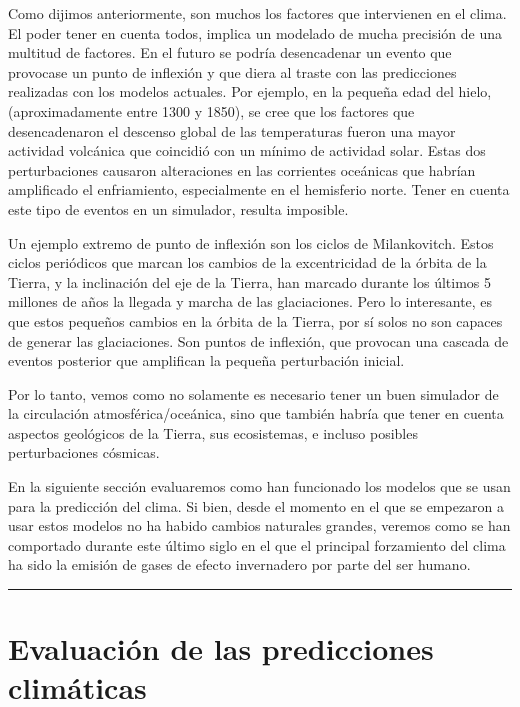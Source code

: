 \documentclass[
  10pt,
  a4paper,
  DIV=11,
  numbers=noendperiod,
  open=any]{scrreprt}
\numberwithin{equation}{chapter}
\numberwithin{equation}{section}
\renewcommand{\[}{\begin{equation}}
\renewcommand{\]}{\end{equation}}
\begin{document}
Como dijimos anteriormente, son muchos los factores que intervienen en
el clima. El poder tener en cuenta todos, implica un modelado de mucha
precisión de una multitud de factores. En el futuro se podría
desencadenar un evento que provocase un punto de inflexión y que diera
al traste con las predicciones realizadas con los modelos actuales. Por
ejemplo, en la pequeña edad del hielo, (aproximadamente entre 1300 y
1850), se cree que los factores que desencadenaron el descenso global de
las temperaturas fueron una mayor actividad volcánica que coincidió con
un mínimo de actividad solar. Estas dos perturbaciones causaron
alteraciones en las corrientes oceánicas que habrían amplificado el
enfriamiento, especialmente en el hemisferio norte. Tener en cuenta este
tipo de eventos en un simulador, resulta imposible.

Un ejemplo extremo de punto de inflexión son los ciclos de Milankovitch.
Estos ciclos periódicos que marcan los cambios de la excentricidad de la
órbita de la Tierra, y la inclinación del eje de la Tierra, han marcado
durante los últimos 5 millones de años la llegada y marcha de las
glaciaciones. Pero lo interesante, es que estos pequeños cambios en la
órbita de la Tierra, por sí solos no son capaces de generar las
glaciaciones. Son puntos de inflexión, que provocan una cascada de
eventos posterior que amplifican la pequeña perturbación inicial.

Por lo tanto, vemos como no solamente es necesario tener un buen
simulador de la circulación atmosférica/oceánica, sino que también
habría que tener en cuenta aspectos geológicos de la Tierra, sus
ecosistemas, e incluso posibles perturbaciones cósmicas.

En la siguiente sección evaluaremos como han funcionado los modelos que
se usan para la predicción del clima. Si bien, desde el momento en el
que se empezaron a usar estos modelos no ha habido cambios naturales
grandes, veremos como se han comportado durante este último siglo en el
que el principal forzamiento del clima ha sido la emisión de gases de
efecto invernadero por parte del ser humano.

\begin{center}\rule{0.5\linewidth}{0.5pt}\end{center}

\chapter{Evaluación de las predicciones
climáticas}\label{evaluaciuxf3n-de-las-predicciones-climuxe1ticas}
\end{document}
